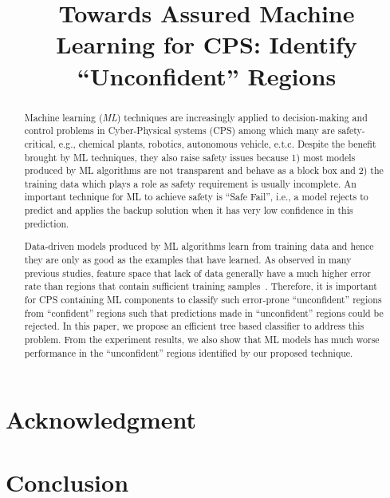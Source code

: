 \documentclass[10pt,conference]{IEEEtran}
\begin{document}
\title{Towards Assured Machine Learning for CPS: Identify ``Unconfident'' Regions}
\author{
}
\maketitle


\begin{abstract} 
Machine learning (\emph{ML})  techniques are increasingly applied to decision-making and control problems in Cyber-Physical systems (CPS)  among which many are safety-critical, e.g., chemical  plants, robotics, autonomous vehicle, e.t.c.  Despite the benefit brought by ML techniques, they also raise safety issues because  1) most models produced by ML algorithms are not transparent and behave as  a block box and 2) the training data which plays a role as safety requirement is usually incomplete. An important  technique for  ML  to achieve safety  is ``Safe Fail'', i.e., a model rejects to predict and applies the backup solution when it has very low confidence in this prediction.  

Data-driven models produced by ML algorithms learn from training data and hence they are only as good as the examples that have learned.   As observed in many previous studies, feature space that lack of data generally have a much higher error rate than regions that contain sufficient  training samples~\cite{weiss2004mining}. Therefore, it is important  for CPS containing ML components  to classify such error-prone ``unconfident'' regions from ``confident'' regions such that predictions made in ``unconfident'' regions could be rejected.  In this paper, we propose an efficient tree based classifier to address this problem.  From the experiment results, we also show that ML models has much worse performance in the ``unconfident'' regions identified by our proposed technique. 

\end{abstract}






\section*{Acknowledgment}


\section{Conclusion}




\end{document}
